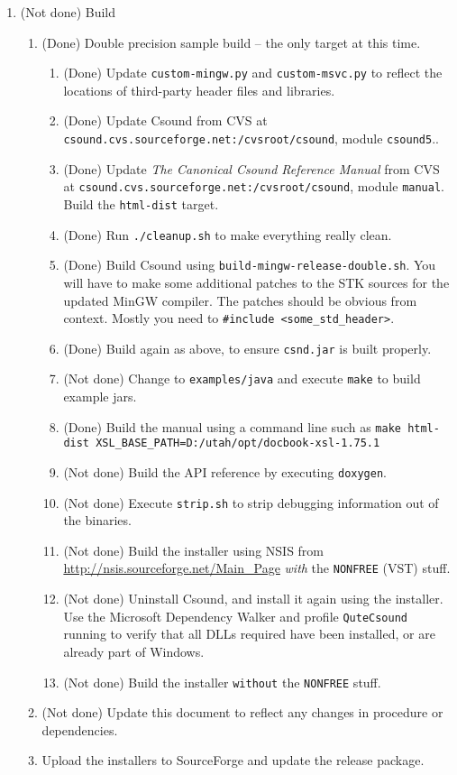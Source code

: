 \documentclass[11pt,letterpaper,onecolumn]{scrartcl}
\begin{document}
\begin{sloppypar}
\begin{enumerate}
\begin{enumerate}
			
 		\end{enumerate}
	\item (Not done) Build   
		\begin{enumerate}				
			\item (Done) Double precision sample build -- the only target at this time.
				\begin{enumerate}
		    	\item (Done) Update \texttt{custom-mingw.py} and \texttt{custom-msvc.py} to reflect the locations of third-party header files and libraries.
					\item (Done) Update Csound from CVS at \verb|csound.cvs.sourceforge.net:/cvsroot/csound|, module \texttt{csound5}..
					\item (Done) Update \emph{The Canonical Csound Reference Manual} from CVS at \verb|csound.cvs.sourceforge.net:/cvsroot/csound|, module \texttt{manual}. Build the \texttt{html-dist} target.
					\item (Done) Run \texttt{./cleanup.sh} to make everything really clean.
			    \item (Done) Build Csound using \texttt{build-mingw-release-double.sh}. You will have to make some additional patches to the STK sources for the updated MinGW compiler. The patches should be obvious from context. Mostly you need to \verb|#include <some_std_header>|.
			    \item (Done) Build again as above, to ensure \texttt{csnd.jar} is built properly.
			    \item (Not done) Change to \texttt{examples/java} and execute \texttt{make} to build example jars.
			    \item (Done) Build the manual using a command line such as \verb|make html-dist XSL_BASE_PATH=D:/utah/opt/docbook-xsl-1.75.1|
			    \item (Not done) Build the API reference by executing \texttt{doxygen}.
			    \item (Not done) Execute \texttt{strip.sh} to strip debugging information out of the binaries.
			    \item (Not done) Build the installer using NSIS from \url{http://nsis.sourceforge.net/Main_Page} \emph{with} the \verb|NONFREE| (VST) stuff.  
			    \item (Not done) Uninstall Csound, and install it again using the installer. Use the Microsoft Dependency Walker and profile \texttt{QuteCsound} running to verify that all DLLs required have been installed, or are already part of Windows.
			    \item (Not done) Build the installer \texttt{without} the \verb|NONFREE| stuff.   
				\end{enumerate}
	    \item (Not done) Update this document to reflect any changes in procedure or dependencies. 
	    \item Upload the installers to SourceForge and update the release package.
		\end{enumerate}
 \end{enumerate}


\end{sloppypar}
\end{document}
